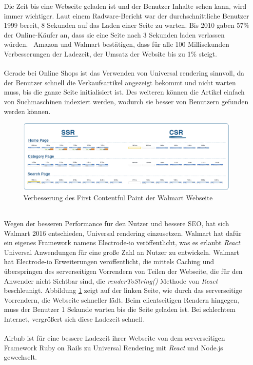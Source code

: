 \documentclass[runningheads]{llncs}
\begin{document}
Die Zeit bis eine Webseite geladen ist und der Benutzer Inhalte sehen kann, 
wird immer wichtiger. 
Laut einem Radware-Bericht war der durchschnittliche Benutzer 1999 bereit, 
8 Sekunden auf das Laden einer Seite zu warten. 
Bis 2010 gaben 57\% der Online-Käufer an, dass sie eine Seite nach 3 Sekunden laden verlassen würden. 
Amazon und Walmart bestätigen, dass für alle 100 Millisekunden Verbesserungen der Ladezeit, 
der Umsatz der Website bis zu 1\% steigt. \cite{young} \cite{einav_2019}
\\
\\
Gerade bei Online Shops ist das Verwenden von Universal rendering sinnvoll, 
da der Benutzer schnell die Verkaufsartikel angezeigt bekommt und nicht warten muss, 
bis die ganze Seite initialisiert ist. 
Des weiteren können die Artikel einfach von Suchmaschinen indexiert werden, 
wodurch sie besser von Benutzern gefunden werden können.
\begin{figure}
  \centering
  \includegraphics[width=12cm]{images/ssrvscsrwallmart}
  \caption{Verbesserung des First Contentful Paint der Walmart Webseite}
  \label{Verbesserung des First Contentful Paint der Walmart Webseite}
\end{figure}
\\
Wegen der besseren Performance für den Nutzer und bessere SEO, 
hat sich Walmart 2016 entschieden, 
Universal rendering einzusetzen. 
Walmart hat dafür ein eigenes Framework namens Electrode-io veröffentlicht, 
was es erlaubt \textit{React} Universal Anwendungen für eine große Zahl an Nutzer zu entwickeln. 
Walmart hat Electrode-io Erweiterungen veröffentlicht, 
die mittels Caching und überspringen des serverseitigen Vorrendern von Teilen der Webseite, 
die für den Anwender nicht Sichtbar sind, 
die \textit{renderToString()} Methode von \textit{React} beschleunigt. 
Abbildung \ref{Verbesserung des First Contentful Paint der Walmart Webseite} zeigt auf der linken Seite, 
wie durch das serverseitige Vorrendern, 
die Webseite schneller lädt. Beim clientseitigen Rendern hingegen, 
muss der Benutzer 1 Sekunde warten bis die Seite geladen ist. 
Bei schlechtem Internet, vergrößert sich diese Ladezeit schnell.
\\
\\
Airbnb ist für eine bessere Ladezeit ihrer Webseite 
von dem serverseitigen Framework Ruby on Rails zu Universal Rendering mit \textit{React} und Node.js gewechselt. 
\newpage
\end{document}
